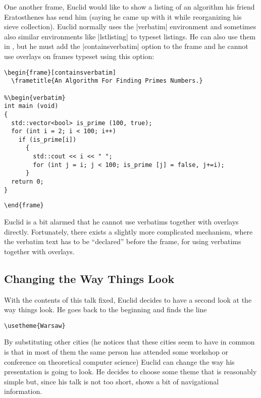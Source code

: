 One another frame, Euclid would like to show a listing of an
algorithm his friend Eratosthenes has send him (saying he came up with
it while reorganizing his sieve collection). Euclid normally uses the
|verbatim| environment and sometimes also similar environments like
|lstlisting| to typeset listings. He can also use them in \beamer, but
he must add the |containsverbatim| option to the frame and he cannot
use overlays on frames typeset using this option:
\begin{verbatim}
\begin{frame}[containsverbatim]
  \frametitle{An Algorithm For Finding Primes Numbers.}

%\begin{verbatim} 
int main (void)
{
  std::vector<bool> is_prime (100, true);
  for (int i = 2; i < 100; i++)
    if (is_prime[i])
      {
        std::cout << i << " ";
        for (int j = i; j < 100; is_prime [j] = false, j+=i);
      }
  return 0;
} 
\end{verbatim}
\unskip{\MacroFont|\end{verbatim}|}
\begin{verbatim}
\end{frame}
\end{verbatim}
Euclid is a bit alarmed that he cannot use verbatims together with
overlays directly. Fortunately, there exists a slightly more
complicated mechanism, where the verbatim text has to be ``declared''
before the frame, for using verbatims together with overlays.



\subsection{Changing the Way Things Look}

With the contents of this talk fixed, Euclid decides to have a second
look at the way things look. He goes back to the beginning and finds
the line
\begin{verbatim}
\usetheme{Warsaw}
\end{verbatim}
By substituting other cities (he notices that these cities seem to
have in common is that in most of them the same person 
has attended some workshop or conference on theoretical computer
science) Euclid can change the way his presentation is going to
look. He decides to choose some theme that is reasonably simple but,
since his talk is not too short, shows a bit of navigational
information.

